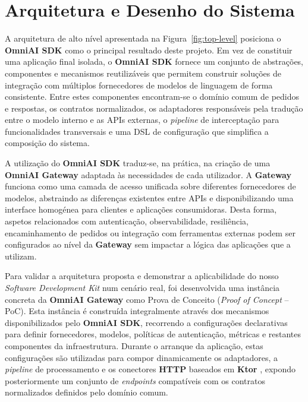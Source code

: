     \chapter{Arquitetura e Desenho do Sistema}

A arquitetura de alto nível apresentada na Figura~\ref{fig:top-level} posiciona o \textbf{OmniAI SDK} como o principal resultado deste projeto. Em vez de constituir uma aplicação final isolada, o \textbf{OmniAI SDK} fornece um conjunto de abstrações, componentes e mecanismos reutilizáveis que permitem construir soluções de integração com múltiplos fornecedores de modelos de linguagem de forma consistente. Entre estes componentes encontram-se o domínio comum de pedidos e respostas, os contratos normalizados, os adaptadores responsáveis pela tradução entre o modelo interno e as APIs externas, o \textit{pipeline} de interceptação para funcionalidades transversais e uma DSL de configuração que simplifica a composição do sistema.

A utilização do \textbf{OmniAI SDK} traduz-se, na prática, na criação de uma \textbf{OmniAI Gateway} adaptada às necessidades de cada utilizador. A \textbf{Gateway} funciona como uma camada de acesso unificada sobre diferentes fornecedores de modelos, abstraindo as diferenças existentes entre APIs e disponibilizando uma interface homogénea para clientes e aplicações consumidoras. Desta forma, aspetos relacionados com autenticação, observabilidade, resiliência, encaminhamento de pedidos ou integração com ferramentas externas podem ser configurados ao nível da \textbf{Gateway} sem impactar a lógica das aplicações que a utilizam.

Para validar a arquitetura proposta e demonstrar a aplicabilidade do nosso \textit{Software Development Kit} num cenário real, foi desenvolvida uma instância concreta da \textbf{OmniAI Gateway} como Prova de Conceito (\textit{Proof of Concept} -- PoC). Esta instância é construída integralmente através dos mecanismos disponibilizados pelo \textbf{OmniAI SDK}, recorrendo a configurações declarativas para definir fornecedores, modelos, políticas de autenticação, métricas e restantes componentes da infraestrutura. Durante o arranque da aplicação, estas configurações são utilizadas para compor dinamicamente os adaptadores, a \textit{pipeline} de processamento e os conectores \textbf{HTTP} baseados em \textbf{Ktor} \cite{ktor_ref}, expondo posteriormente um conjunto de \textit{endpoints} compatíveis com os contratos normalizados definidos pelo domínio comum.

